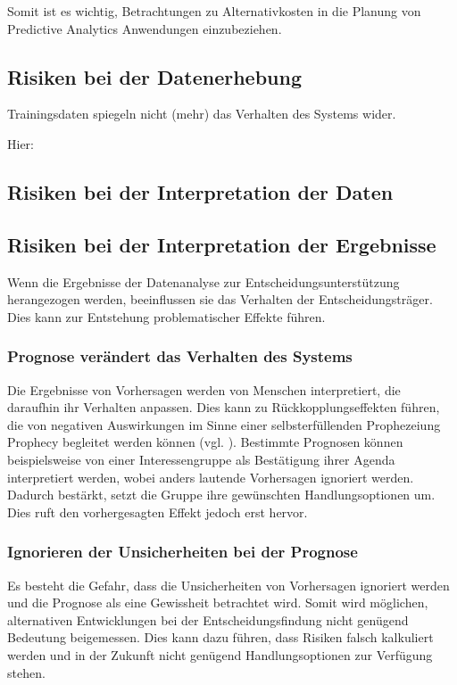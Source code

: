 Somit ist es wichtig, Betrachtungen zu Alternativkosten
in die Planung von Predictive Analytics Anwendungen einzubeziehen. 

\subsection{Risiken bei der Datenerhebung}

Trainingsdaten spiegeln nicht (mehr) das Verhalten des Systems wider.

Hier: \cite{Springer}

\subsection{Risiken bei der Interpretation der Daten}

\subsection{Risiken bei der Interpretation der Ergebnisse}

Wenn die Ergebnisse der Datenanalyse zur Entscheidungsunterstützung herangezogen
werden, beeinflussen sie das Verhalten der Entscheidungsträger. Dies kann zur
Entstehung problematischer Effekte führen.

\subsubsection{Prognose verändert das Verhalten des Systems }

Die Ergebnisse von Vorhersagen werden von Menschen interpretiert,
die daraufhin ihr Verhalten anpassen. Dies kann zu Rückkopplungseffekten führen,
die von negativen Auswirkungen im Sinne einer selbsterfüllenden Prophezeiung
 Prophecy\grqq{} begleitet werden können
(vgl. \cite{Crossman}). 
Bestimmte Prognosen können beispielsweise von einer 
Interessengruppe als Bestätigung ihrer Agenda interpretiert werden, wobei
anders lautende Vorhersagen ignoriert werden. Dadurch bestärkt, setzt die Gruppe
ihre gewünschten Handlungsoptionen um. Dies ruft den vorhergesagten Effekt
jedoch erst hervor.

\subsubsection{Ignorieren der Unsicherheiten bei der Prognose}

Es besteht die Gefahr, dass die Unsicherheiten von Vorhersagen ignoriert werden
und die Prognose als eine Gewissheit betrachtet wird. Somit wird möglichen,
alternativen Entwicklungen bei der Entscheidungsfindung nicht genügend Bedeutung
beigemessen. Dies kann dazu führen, dass Risiken falsch kalkuliert werden und
in der Zukunft nicht genügend Handlungsoptionen zur Verfügung stehen.

